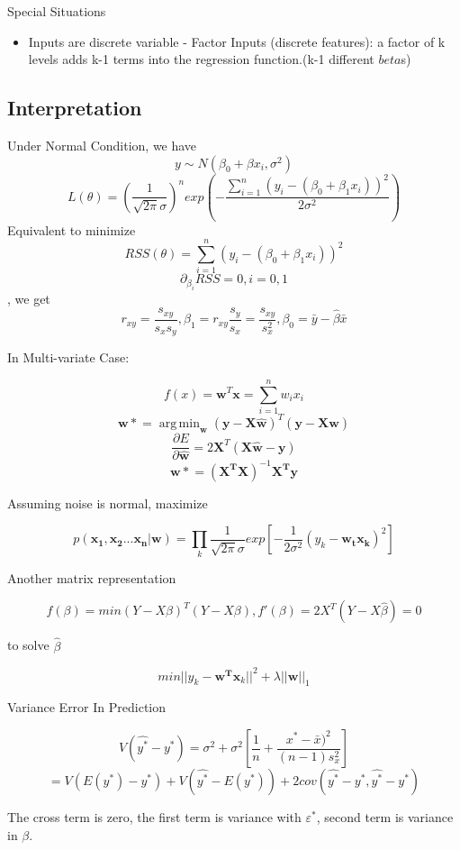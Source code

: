 \documentclass[11pt, openany]{book}              %
\DeclareMathOperator*{\argmin}{arg\,min}  %
\begin{document}
Special Situations

\begin{itemize}
    \item Inputs are discrete variable - Factor Inputs (discrete features): a factor of k levels adds k-1 terms into the regression function.(k-1 different $beta$s)
\end{itemize}


\subsection{Interpretation}


Under Normal Condition, we have
$$y \sim N(\beta_0 + \beta x_i, \sigma^2)$$
$$ L(\theta) = (\frac{1}{\sqrt{2\pi} \sigma})^n exp( - \frac{\sum_{i=1}^n (y_i - (\beta_0 +\beta_1x_i))^2}{2\sigma^2})$$ 
Equivalent to minimize
$$RSS(\theta) = \sum_{i=1}^n (y_i - (\beta_0 +\beta_1x_i))^2$$
$$ \partial_{\beta_i} RSS = 0, i =0,1$$, we get
$$ r_{xy} = \frac{s_{xy}}{s_xs_y}, \beta_1 = r_{xy}\frac{s_y}{s_x} =\frac{s_{xy}}{s_x^2},\beta_0 = \bar{y}-\hat{\beta}\bar{x} $$

In Multi-variate Case:

$$ f(x) = \mathbf{w}^T \mathbf{x} = \sum_{i=1}^n w_i x_i $$
$$\mathbf{w*} = \argmin_{\mathbf{\hat{w}}}(\mathbf{y}-\mathbf{X \hat{w}} )^T(\mathbf{y}-\mathbf{X \hat{w}} )$$
$$\frac{\partial{E}}{\partial{\mathbf{\hat{w}}}} = 2 \mathbf{X}^T(\mathbf{X \hat{w}} - \mathbf{y})$$
$$ \mathbf{w*} = (\mathbf{X^T X})^{-1} \mathbf{X^T y} $$

Assuming noise is normal, maximize 

$$p(\mathbf{x_1, x_2 ... x_n}| \mathbf{ w} ) = \prod_k \frac{1}{\sqrt{2\pi} \sigma} exp[ -\frac{1}{2\sigma^2} (y_k - \mathbf{w_t x_k} )^2 ]$$ 

Another matrix representation

$$f(\beta) = min (Y-X\beta)^T(Y-X\beta), f'(\beta) = 2X^T(Y-X\hat{\beta}) = 0$$ 

to solve $\hat{\beta}$

$$ min ||y_k - \mathbf{w^T x}_k ||^2 + \lambda ||\mathbf{w}||_1 $$


Variance Error In Prediction

$$V(\hat{y^*} - y^*) = \sigma^2 + \sigma^2[\frac{1}{n} + \frac{x^*-\bar{x})^2}{(n-1)s_x^2}]$$
$$ = V(E(y^*) - y^*) + V(\hat{y^*} - E(y^*)) + 2 cov(\hat{y^*} - y^*, \hat{y^*} - y^*)$$

The cross term is zero, the first term is variance with $\varepsilon^*$, second term is variance in $\beta$. 
\end{document}

